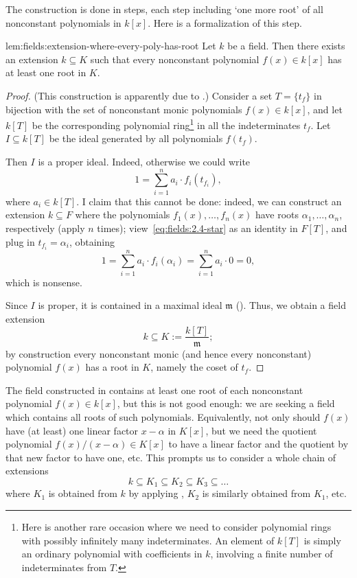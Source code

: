 The construction is done in steps, each step including `one more root'
of all nonconstant polynomials in $k[x]$. Here is a formalization of
this step.
\begin{lem}{}{lem:fields:extension-where-every-poly-has-root}
  Let $k$ be a field. Then there exists an extension $k \subseteq K$
  such that every nonconstant polynomial $f(x) \in k[x]$ has at least
  one root in $K$.
\end{lem}
\begin{proof}
  (This construction is apparently due to .) Consider
  a set $T = \{t_f\}$ in bijection with the set of nonconstant monic
  polynomials $f(x) \in k[x]$, and let $k[T]$ be the corresponding
  polynomial ring\footnote{Here is another rare occasion where we need
    to consider polynomial rings with possibly infinitely many
    indeterminates. An element of $k[T]$ is simply an ordinary
    polynomial with coefficients in $k$, involving a finite number of
    indeterminates from $T$.} in all the indeterminates $t_f$. Let
  $I \subseteq k[T]$ be the ideal generated by all polynomials
  $f(t_f)$.

  Then $I$ is a proper ideal. Indeed, otherwise we could write
  \begin{equation}
    \label{eq:fields:2.4-star}
    1 = \sum_{i=1}^{n} a_i \cdot f_i(t_{f_i}),
  \end{equation}
  where $a_i \in k[T]$. I claim that this cannot be done: indeed, we
  can construct an extension $k \subseteq F$ where the polynomials
  $f_1(x), \dots, f_n(x)$ have roots $\alpha_1, \dots, \alpha_n$,
  respectively (apply  $n$ times);
  view~\eqref{eq:fields:2.4-star} as an identity in $F[T]$, and plug
  in $t_{f_i} = \alpha_i$, obtaining
  \[
    1 = \sum_{i=1}^{n} a_i \cdot f_i(\alpha_i) = \sum_{i=1}^{n} a_i
    \cdot 0 = 0,
  \]
  which is nonsense.

  Since $I$ is proper, it is contained in a maximal ideal
  $\mathfrak{m}$ (). Thus, we obtain a field
  extension
  \[
    k \subseteq K := \frac{k[T]}{\mathfrak{m}};
  \]
  by construction every nonconstant monic (and hence every
  nonconstant) polynomial $f(x)$ has a root in $K$, namely the coset
  of $t_f$.
\end{proof}
The field constructed in  contains at least one
root of each nonconstant polynomial $f(x) \in k[x]$, but this is not
good enough: we are seeking a field which contains all roots of such
polynomials. Equivalently, not only should $f(x)$ have (at least) one
linear factor $x - \alpha$ in $K[x]$, but we need the quotient
polynomial $f(x)/(x - \alpha) \in K[x]$ to have a linear factor and
the quotient by that new factor to have one, etc. This prompts us to
consider a whole chain of extensions
\[
  k \subseteq K_1 \subseteq K_2 \subseteq K_3 \subseteq \dots
\]
where $K_1$ is obtained from $k$ by applying ,
$K_2$ is similarly obtained from $K_1$, etc.


